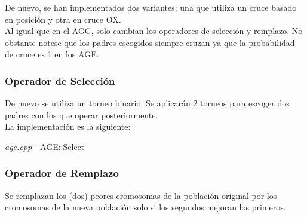 \documentclass[a4paper, 12pt]{article}
\begin{document}
      De nuevo, se han implementados dos variantes; una que utiliza un cruce basado en posición y otra en cruce OX.\\
      
      Al igual que en el AGG, solo cambian los operadores de selección y remplazo. No obstante notese que los padres escogidos siempre cruzan ya que la probabilidad de cruce es 1 en los AGE.
      
      \newpage
      \subsubsection*{Operador de Selección}
      De nuevo se utiliza un torneo binario. Se aplicarán 2 torneos para escoger dos padres con los que operar posteriormente.\\
      
      La implementación es la siguiente:\\
      
      \begin{algorithm}[H]
       	\caption{\textit{age.cpp} - AGE::Select}
       	
         \Def{Select($P$)}{
         	\For{$i = 1$ \KwTo $2$}{
				$r1 = $ random in $[0, n)$\\
            	$r2 = $ random in $[0, n)$\\        	
         	
         		\If{coste $P_{r1}$ desconocido}{
            		Calcula coste $P_{r1}$\\
            		evaluaciones++\\
            	}
            	\If{coste $P_{r2}$ desconocido}{
            		Calcula coste $P_{r2}$\\
            		evaluaciones++\\
            	}
            	
            	\If{coste $P_{r1} \leq P_{r2}$}{
            		$P'_i = P_{r1}$\\
            	} \Else {
					$P'_i = P_{r2}$\\
            	}
         	}
                    
            
            \textbf{return} $P'$\\
         }
      \end{algorithm}
      
      \newpage
      \subsubsection*{Operador de Remplazo}
      Se remplazan los (dos) peores cromosomas de la población original por los cromosomas de la nueva población solo si los segundos mejoran los primeros.\\
      
\end{document}
